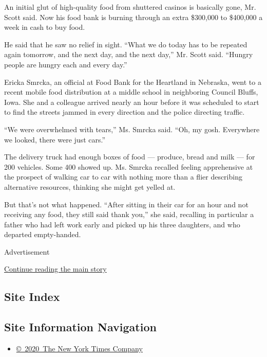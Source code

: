 An initial glut of high-quality food from shuttered casinos is basically
gone, Mr. Scott said. Now his food bank is burning through an extra
\$300,000 to \$400,000 a week in cash to buy food.

He said that he saw no relief in sight. ``What we do today has to be
repeated again tomorrow, and the next day, and the next day,'' Mr. Scott
said. ``Hungry people are hungry each and every day.''

Ericka Smrcka, an official at Food Bank for the Heartland in Nebraska,
went to a recent mobile food distribution at a middle school in
neighboring Council Bluffs, Iowa. She and a colleague arrived nearly an
hour before it was scheduled to start to find the streets jammed in
every direction and the police directing traffic.

``We were overwhelmed with tears,'' Ms. Smrcka said. ``Oh, my gosh.
Everywhere we looked, there were just cars.''

The delivery truck had enough boxes of food --- produce, bread and milk
--- for 200 vehicles. Some 400 showed up. Ms. Smrcka recalled feeling
apprehensive at the prospect of walking car to car with nothing more
than a flier describing alternative resources, thinking she might get
yelled at.

But that's not what happened. ``After sitting in their car for an hour
and not receiving any food, they still said thank you,'' she said,
recalling in particular a father who had left work early and picked up
his three daughters, and who departed empty-handed.

Advertisement

\protect\hyperlink{after-bottom}{Continue reading the main story}

\hypertarget{site-index}{%
\subsection{Site Index}\label{site-index}}

\hypertarget{site-information-navigation}{%
\subsection{Site Information
Navigation}\label{site-information-navigation}}

\begin{itemize}
\tightlist
\item
  \href{https://help.nytimes3xbfgragh.onion/hc/en-us/articles/115014792127-Copyright-notice}{©~2020~The
  New York Times Company}
\end{itemize}

